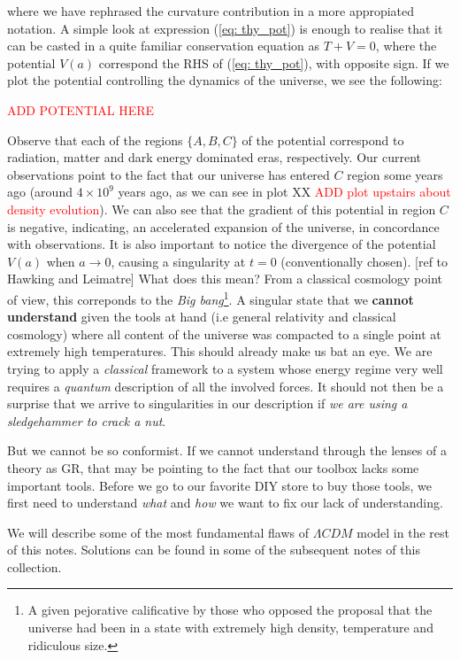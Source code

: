 \documentclass[11pt, a4paper]{article} %
\begin{document}
where we have rephrased the curvature contribution in a more appropiated notation. A simple look at expression (\ref{eq: thy_pot}) is enough to realise that it can be casted in a quite familiar conservation equation as $T + V = 0$, where the potential $V(a)$ correspond the RHS of (\ref{eq: thy_pot}), with opposite sign. If we plot the potential controlling the dynamics of the universe, we see the following:

\textcolor{red}{ADD POTENTIAL HERE}

Observe that each of the regions $\{A, B, C\}$ of the potential correspond to radiation, matter and dark energy dominated eras, respectively. Our current observations point to the fact that our universe has entered $C$ region some years ago (around $4\times 10^{9}$ years ago, as we can see in plot XX \textcolor{red}{ADD plot upstairs about density evolution}). We can also see that the gradient of this potential in region $C$ is negative, indicating, an accelerated expansion of the universe, in concordance with observations. It is also important to notice the divergence of the potential $V(a)$ when $a \rightarrow 0$, causing a singularity at $t=0$ (conventionally chosen). [ref to Hawking and Leimatre] What does this mean? From a classical cosmology point of view, this correponds to the \textit{Big bang}\footnote{A given pejorative calificative by those who opposed the proposal that the universe had been in a state with extremely high density, temperature and ridiculous size.}. A singular state that we \textbf{cannot understand} given the tools at hand (i.e general relativity and classical cosmology) where all content of the universe was compacted to a single point at extremely high temperatures. This should already make us bat an eye. We are trying to apply a \textit{classical} framework to a system whose energy regime very well requires a \textit{quantum} description of all the involved forces. It should not then be a surprise that we arrive to singularities in our description if \textit{we are using a sledgehammer to crack a nut}.

But we cannot be so conformist. If we cannot understand through the lenses of a theory as GR, that may be pointing to the fact that our toolbox lacks some important tools. Before we go to our favorite DIY store to buy those tools, we first need to understand \textit{what} and \textit{how} we want to fix our lack of understanding.

We will describe some of the most fundamental flaws of $\Lambda CDM$ model in the rest of this notes. Solutions can be found in some of the subsequent notes of this collection.
\end{document}
